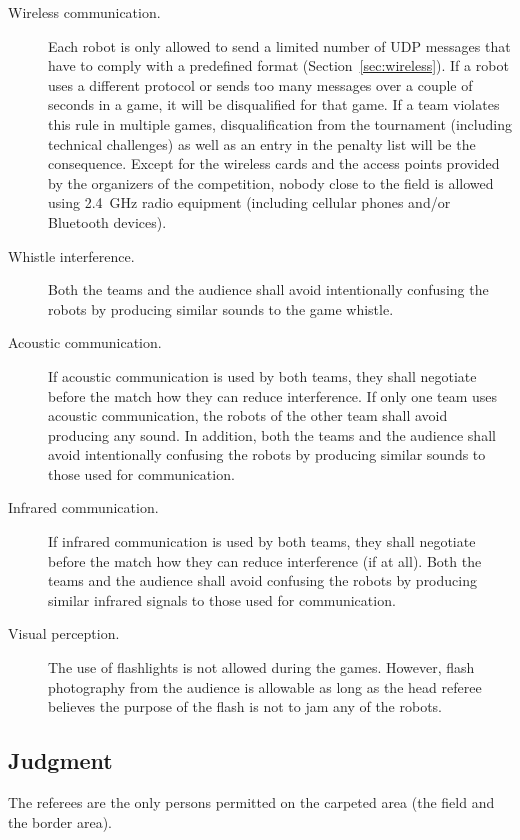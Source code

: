 \begin{description}

\item[Wireless communication.] Each robot is only allowed to send a limited number of UDP messages that have to comply with a predefined format (\cf Section~\ref{sec:wireless}). If a robot uses a different protocol or sends too many messages over a couple of seconds in a game, it will be disqualified for that game. If a team violates this rule in multiple games, disqualification from the tournament (including technical challenges) as well as an entry in the penalty list will be the consequence. Except for the wireless cards and the access points provided by the organizers of the competition, nobody close to the field is allowed using 2.4~GHz radio equipment (including cellular phones and/or Bluetooth devices).

\item[Whistle interference.] Both the teams and the audience shall avoid intentionally confusing the robots by producing similar sounds to the game whistle.

\item[Acoustic communication.] If acoustic communication is used by both teams, they shall negotiate before the match how they can reduce interference. If only one team uses acoustic communication, the robots of the other team shall avoid producing any sound. In addition, both the teams and the audience shall avoid intentionally confusing the robots by producing similar sounds to those used for communication.

\item[Infrared communication.] If infrared communication is used by both teams, they shall negotiate before the match how they can reduce interference (if at all). Both the teams and the audience shall avoid confusing the robots by producing similar infrared signals to those used for communication.

\item[Visual perception.] The use of flashlights is not allowed during the games.  However, flash photography from the audience is allowable as long as the head referee believes the purpose of the flash is not to jam any of the robots.

\end{description}

\subsection{Judgment}
\label{sec:judgment}
The referees are the only persons permitted on the carpeted area (\ie the field and the border area).

